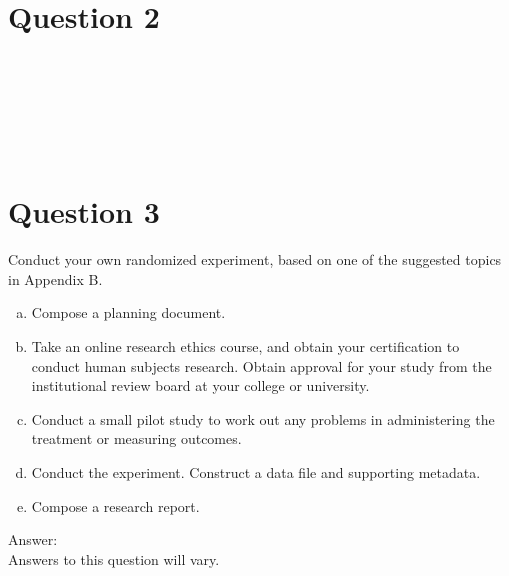 \documentclass[11pt,notitlepage]{article}\usepackage[]{graphicx}\usepackage[]{color}
\makeatletter
\newenvironment{kframe}{%
 \def\at@end@of@kframe{}%
 \ifinner\ifhmode%
  \def\at@end@of@kframe{\end{minipage}}%
  \begin{minipage}{\columnwidth}%
 \fi\fi%
 \def\FrameCommand##1{\hskip\@totalleftmargin \hskip-\fboxsep
 \colorbox{shadecolor}{##1}\hskip-\fboxsep
     \hskip-\linewidth \hskip-\@totalleftmargin \hskip\columnwidth}%
 \MakeFramed {\advance\hsize-\width
   \@totalleftmargin\z@ \linewidth\hsize
   \@setminipage}}%
 {\par\unskip\endMakeFramed%
 \at@end@of@kframe}
\newenvironment{knitrout}{}{} %
\makeatother
\begin{document}
\section*{Question 2}
\begin{knitrout}
\color{fgcolor}\begin{kframe}
\begin{verbatim}






\end{verbatim}
\end{kframe}
\end{knitrout}



\section*{Question 3}
Conduct your own randomized experiment, based on one of the suggested topics in Appendix B.
\begin{enumerate}[a)]
\item Compose a planning document.
\item Take an online research ethics course, and obtain your certification to conduct human subjects research. Obtain approval for your study from the institutional review board at your college or university.
\item Conduct a small pilot study to work out any problems in administering the treatment or measuring outcomes.
\item Conduct the experiment. Construct a data file and supporting metadata.
\item Compose a research report.
\end{enumerate}
Answer:\\
Answers to this question will vary.
\end{document}
